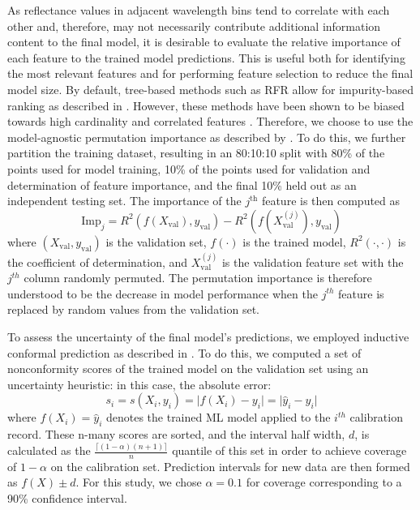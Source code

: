 \documentclass[remotesensing,article,accept,pdftex,moreauthors]{Definitions/mdpi}
\begin{document}
As reflectance values in adjacent wavelength bins tend to correlate with each other and, therefore, may not necessarily contribute additional information content to the final model, it is desirable to evaluate the relative importance of each feature to the trained model predictions. This is useful both for identifying the most relevant features and for performing feature selection to reduce the final model size. By default, tree-based methods such as RFR allow for impurity-based ranking as described in \cite{random-forest, rfr-importance-ranking}. However, these methods have been shown to be biased towards high cardinality and correlated features \cite{strobl2008conditional}. Therefore, we choose to use the model-agnostic permutation importance as described by \cite{parr2018beware}. To do this, we further partition the training dataset, resulting in an 80:10:10 split with 80\% of the points used for model training, 10\% of the points used for validation and determination of feature importance, and the final 10\% held out as an independent testing set. The importance of the $j^{\text{th}}$ feature is then computed as
\begin{equation}
    \text{Imp}_j = R^2(f(X_{\text{val}}), y_{\text{val}}) - R^2(f(X_{\text{val}}^{(j)}), y_{\text{val}})
\end{equation}
where $(X_{\text{val}}, y_{\text{val}})$ is the validation set, $f(\cdot)$ is the trained model, $R^2(\cdot, \cdot)$ is the coefficient of determination, and $X_{\text{val}}^{(j)}$ is the validation feature set with the $j^{th}$ column randomly permuted. The permutation importance is therefore understood to be the decrease in model performance when the $j^{th}$ feature is replaced by random values from the validation set.

To assess the uncertainty of the final model's predictions, we employed inductive conformal prediction as described in \cite{conformal-prediction-1, conformal-prediction-2, conformal-prediction-3, conformal-prediction-4}. To do this, we computed a set of nonconformity scores of the trained model on the validation set using an uncertainty heuristic: in this case, the absolute error:
\begin{equation}
    s_i = s(X_i, y_i) = \lvert f(X_i) - y_i \rvert = \lvert \hat{y}_i - y_i \rvert
\end{equation}
where $f(X_i)=\hat{y}_i$ denotes the trained ML model applied to the $i^{th}$ calibration record. These n-many scores are sorted, and the interval half width, $d$, is calculated as the $\frac{\lceil(1-\alpha)(n+1) \rceil}{n}$ quantile of this set in order to achieve coverage of $1-\alpha$ on the calibration set. Prediction intervals for new data are then formed as $f(X)\pm d$. For this study, we chose $\alpha=0.1$ for coverage corresponding to a 90\% confidence interval.
\end{document}
